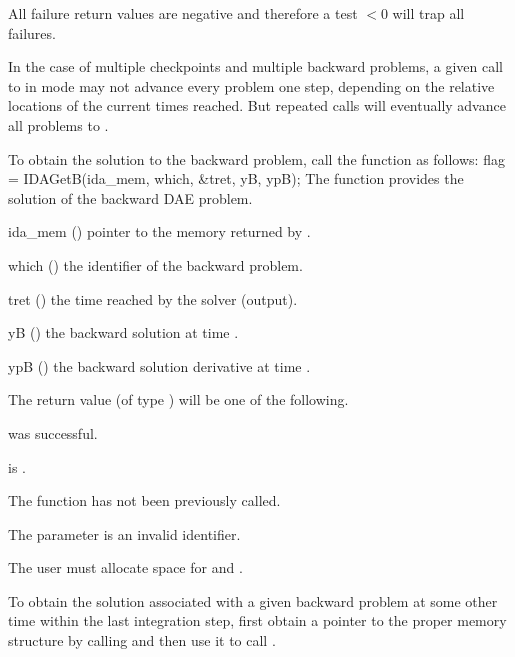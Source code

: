 {
  All failure return values are negative and therefore a test $< 0$
  will trap all  failures.

  In the case of multiple checkpoints and multiple backward problems, a given
  call to  in  mode may not advance every problem
  one step, depending on the relative locations of the current times reached.
  But repeated calls will eventually advance all problems to .
}
To obtain the solution  to the backward problem, call the function
 as follows:
{
  flag = IDAGetB(ida\_mem, which, \&tret, yB, ypB);
}
{
  The function  provides the solution  of the backward DAE
  problem.
}
{
  \begin{args}
  \item[ida\_mem] ()
    pointer to the {\idas} memory returned by .
  \item[which] ()
    the identifier of the backward problem.
  \item[tret] ()
    the time reached by the solver (output).
  \item[yB] ()
    the backward solution at time .
  \item[ypB] ()
    the backward solution derivative at time .
  \end{args}
}
{
  The return value  (of type ) will be one of the following.
  \begin{args}
  \item[\Id{IDA\_SUCCESS}]
     was successful.
  \item[\Id{IDA\_MEM\_NULL}]
     is .
  \item[\Id{IDA\_NO\_ADJ}]
    The function  has not been previously called.
   \item[\Id{IDA\_ILL\_INPUT}]
    The parameter  is an invalid identifier.
  \end{args}
}
{
  {\warn}The user must allocate space for  and .

  To obtain the solution associated with a given backward problem at some
  other time within the last integration step, first obtain a pointer to the
  proper {\idas} memory structure by calling 
  and then use it to call .
}


